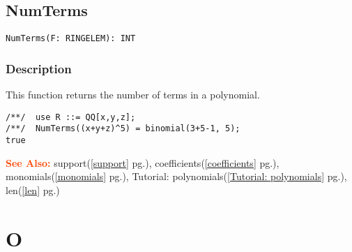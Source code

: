\documentclass[a4paper]{mybook}
\newenvironment{command}{}{} %
\newcommand\SeeAlso{\par\textcolor{OrangeRed}{\textbf{\large See Also: }}}
\begin{document}
\section{NumTerms}
\label{NumTerms}
\begin{command} %


\begin{Verbatim}[label=syntax, rulecolor=\color{MidnightBlue},
frame=single]
NumTerms(F: RINGELEM): INT
\end{Verbatim}


\subsection*{Description}

This function returns the number of terms in a polynomial.
\begin{Verbatim}[label=example, rulecolor=\color{PineGreen}, frame=single]
/**/  use R ::= QQ[x,y,z];
/**/  NumTerms((x+y+z)^5) = binomial(3+5-1, 5);
true
\end{Verbatim}


\SeeAlso %
  support(\ref{support} pg.\pageref{support}), 
    coefficients(\ref{coefficients} pg.\pageref{coefficients}), 
    monomials(\ref{monomials} pg.\pageref{monomials}), 
    Tutorial: polynomials(\ref{Tutorial: polynomials} pg.\pageref{Tutorial: polynomials}), 
    len(\ref{len} pg.\pageref{len})
\end{command} %

\chapter{O}  %
\label{O}
\end{document}

